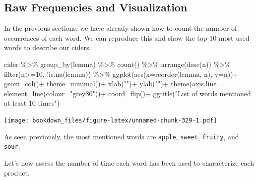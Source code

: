 \documentclass[
]{krantz}
\makeatletter
\newenvironment{Shaded}{\begin{snugshade}}{\end{snugshade}}
\newcommand{\AttributeTok}[1]{\textcolor[rgb]{0.61,0.61,0.61}{#1}}
\newcommand{\DecValTok}[1]{\textcolor[rgb]{0.06,0.06,0.06}{#1}}
\newcommand{\FunctionTok}[1]{\textcolor[rgb]{0,0,0}{#1}}
\newcommand{\NormalTok}[1]{#1}
\newcommand{\SpecialCharTok}[1]{\textcolor[rgb]{0,0,0}{#1}}
\newcommand{\StringTok}[1]{\textcolor[rgb]{0.5,0.5,0.5}{#1}}
\newenvironment{kframe}{%
\medskip{}
\setlength{\fboxsep}{.8em}
 \def\at@end@of@kframe{}%
 \ifinner\ifhmode%
  \def\at@end@of@kframe{\end{minipage}}%
  \begin{minipage}{\columnwidth}%
 \fi\fi%
 \def\FrameCommand##1{\hskip\@totalleftmargin \hskip-\fboxsep
 \colorbox{shadecolor}{##1}\hskip-\fboxsep
     \hskip-\linewidth \hskip-\@totalleftmargin \hskip\columnwidth}%
 \MakeFramed {\advance\hsize-\width
   \@totalleftmargin\z@ \linewidth\hsize
   \@setminipage}}%
 {\par\unskip\endMakeFramed%
 \at@end@of@kframe}
\renewenvironment{Shaded}{\begin{kframe}}{\end{kframe}}
\makeatother
\begin{document}
\hypertarget{raw-frequencies-and-visualization}{%
\subsection{Raw Frequencies and Visualization}\label{raw-frequencies-and-visualization}}

In the previous sections, we have already shown how to count the number of occurrences of each word. We can reproduce this and show the top 10 most used words to describe our ciders:

\begin{Shaded}
\begin{Highlighting}[]
\NormalTok{cider }\SpecialCharTok{\%\textgreater{}\%} 
  \FunctionTok{group\_by}\NormalTok{(lemma) }\SpecialCharTok{\%\textgreater{}\%} 
  \FunctionTok{count}\NormalTok{() }\SpecialCharTok{\%\textgreater{}\%} 
  \FunctionTok{arrange}\NormalTok{(}\FunctionTok{desc}\NormalTok{(n)) }\SpecialCharTok{\%\textgreater{}\%} 
  \FunctionTok{filter}\NormalTok{(n}\SpecialCharTok{\textgreater{}=}\DecValTok{10}\NormalTok{, }\SpecialCharTok{!}\FunctionTok{is.na}\NormalTok{(lemma)) }\SpecialCharTok{\%\textgreater{}\%} 
  \FunctionTok{ggplot}\NormalTok{(}\FunctionTok{aes}\NormalTok{(}\AttributeTok{x=}\FunctionTok{reorder}\NormalTok{(lemma, n), }\AttributeTok{y=}\NormalTok{n))}\SpecialCharTok{+}
  \FunctionTok{geom\_col}\NormalTok{()}\SpecialCharTok{+}
  \FunctionTok{theme\_minimal}\NormalTok{()}\SpecialCharTok{+}
  \FunctionTok{xlab}\NormalTok{(}\StringTok{""}\NormalTok{)}\SpecialCharTok{+}
  \FunctionTok{ylab}\NormalTok{(}\StringTok{""}\NormalTok{)}\SpecialCharTok{+}
  \FunctionTok{theme}\NormalTok{(}\AttributeTok{axis.line =} \FunctionTok{element\_line}\NormalTok{(}\AttributeTok{colour=}\StringTok{"grey80"}\NormalTok{))}\SpecialCharTok{+}
  \FunctionTok{coord\_flip}\NormalTok{()}\SpecialCharTok{+}
  \FunctionTok{ggtitle}\NormalTok{(}\StringTok{"List of words mentioned at least 10 times"}\NormalTok{)}
\end{Highlighting}
\end{Shaded}

\texttt{[image: bookdown\_files/figure-latex/unnamed-chunk-329-1.pdf]}

As seen previously, the most mentioned words are \texttt{apple}, \texttt{sweet}, \texttt{fruity}, and \texttt{sour}.

Let's now assess the number of time each word has been used to characterize each product.
\end{document}

